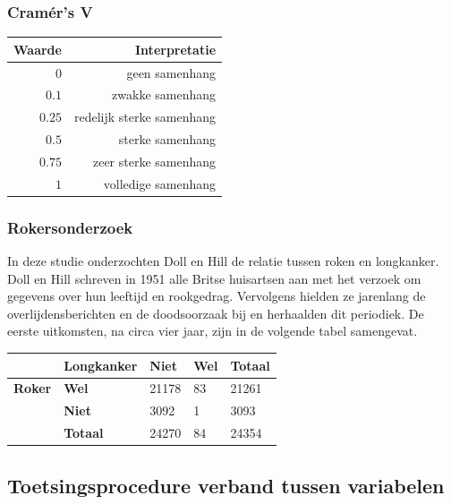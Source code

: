 \begin{frame}
	\frametitle{Cramér's V}
	\begin{table}[h] \centering
		\begin{tabular}{@{}rr@{}} \toprule
			Waarde & Interpretatie \\
			\midrule
			$0$ & geen samenhang \\
			$0.1$ &  zwakke samenhang \\
			$0.25$ & redelijk sterke samenhang \\
			$0.5$ & sterke samenhang \\
			$0.75$ & zeer sterke samenhang \\
			$1$ & volledige samenhang \\
			\bottomrule
		\end{tabular}
	\end{table}
\end{frame}

\begin{frame}
	\frametitle{Rokersonderzoek}
	In deze studie onderzochten Doll en Hill de relatie tussen roken en longkanker. Doll en Hill schreven in 1951 alle Britse huisartsen aan met het verzoek om gegevens over hun leeftijd en rookgedrag. Vervolgens hielden ze jarenlang de overlijdensberichten en de doodsoorzaak bij en herhaalden dit periodiek. De eerste uitkomsten, na circa vier jaar, zijn in de volgende tabel samengevat.
	
	\begin{table}[h]
		\begin{tabular}{@{}lllll@{}}
			\toprule
			& \textbf{Longkanker} & \textbf{Niet} & \textbf{Wel} & \textbf{Totaal} \\ \midrule
			\textbf{Roker} & \textbf{Wel}        & 21178         & 83           & 21261           \\
			& \textbf{Niet}       & 3092          & 1            & 3093            \\
			& \textbf{Totaal}     & 24270         & 84           & 24354           \\ \bottomrule
		\end{tabular}
	\end{table}
\end{frame}

\subsection{Toetsingsprocedure verband tussen variabelen}

